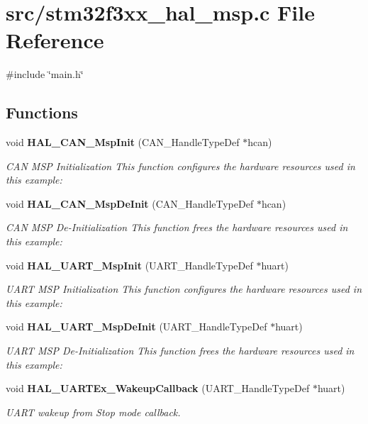 \section{src/stm32f3xx\+\_\+hal\+\_\+msp.c File Reference}
\label{stm32f3xx__hal__msp_8c}
{\ttfamily \#include \char`\"{}main.\+h\char`\"{}}\newline
\subsection*{Functions}
\begin{DoxyCompactItemize}
\item 
void \textbf{ H\+A\+L\+\_\+\+C\+A\+N\+\_\+\+Msp\+Init} (C\+A\+N\+\_\+\+Handle\+Type\+Def $\ast$hcan)
\begin{DoxyCompactList}\small\item\em C\+AN M\+SP Initialization This function configures the hardware resources used in this example\+: \end{DoxyCompactList}\item 
void \textbf{ H\+A\+L\+\_\+\+C\+A\+N\+\_\+\+Msp\+De\+Init} (C\+A\+N\+\_\+\+Handle\+Type\+Def $\ast$hcan)
\begin{DoxyCompactList}\small\item\em C\+AN M\+SP De-\/\+Initialization This function frees the hardware resources used in this example\+: \end{DoxyCompactList}\item 
void \textbf{ H\+A\+L\+\_\+\+U\+A\+R\+T\+\_\+\+Msp\+Init} (U\+A\+R\+T\+\_\+\+Handle\+Type\+Def $\ast$huart)
\begin{DoxyCompactList}\small\item\em U\+A\+RT M\+SP Initialization This function configures the hardware resources used in this example\+: \end{DoxyCompactList}\item 
void \textbf{ H\+A\+L\+\_\+\+U\+A\+R\+T\+\_\+\+Msp\+De\+Init} (U\+A\+R\+T\+\_\+\+Handle\+Type\+Def $\ast$huart)
\begin{DoxyCompactList}\small\item\em U\+A\+RT M\+SP De-\/\+Initialization This function frees the hardware resources used in this example\+: \end{DoxyCompactList}\item 
void \textbf{ H\+A\+L\+\_\+\+U\+A\+R\+T\+Ex\+\_\+\+Wakeup\+Callback} (U\+A\+R\+T\+\_\+\+Handle\+Type\+Def $\ast$huart)
\begin{DoxyCompactList}\small\item\em U\+A\+RT wakeup from Stop mode callback. \end{DoxyCompactList}\item 

\end{DoxyCompactItemize}
